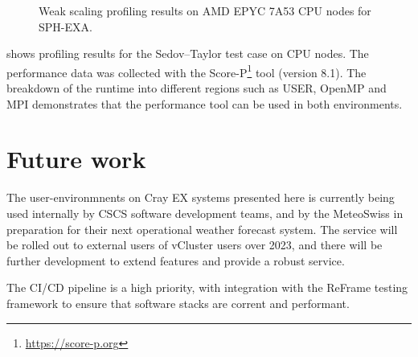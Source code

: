 \begin{figure}[htp!]
    \begin{center}
        
    \end{center}
    \caption{Weak scaling profiling results on AMD EPYC 7A53 CPU nodes for SPH-EXA.}
    \label{fig:sph-weak-scorep}
\end{figure}

 shows profiling results for the Sedov--Taylor test case on CPU nodes.
The performance data was collected with the Score-P\footnote{\url{https://score-p.org}} tool (version 8.1).
The breakdown of the runtime into different regions such as USER, OpenMP and MPI demonstrates that the performance tool can be used in both environments.



\section{Future work}

The user-environmnents on Cray EX systems presented here is currently being used internally by CSCS software development teams, and by the MeteoSwiss in preparation for their next operational weather forecast system.
The service will be rolled out to external users of vCluster users over 2023, and there will be further development to extend features and provide a robust service.

The CI/CD pipeline is a high priority, with integration with the ReFrame testing framework to ensure that software stacks are corrent and performant.

